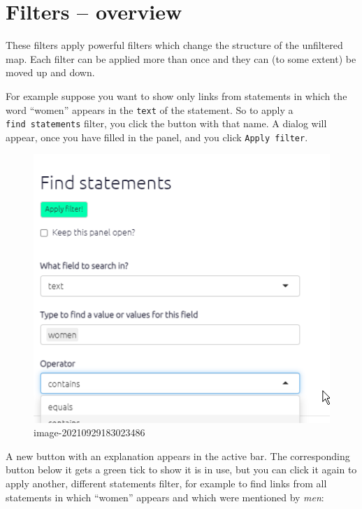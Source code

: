 \documentclass[
]{book}
\begin{document}
\hypertarget{filters-overview}{%
\chapter{Filters -- overview}\label{filters-overview}}

These filters apply powerful filters which change the structure of the unfiltered map. Each filter can be applied more than once and they can (to some extent) be moved up and down.

For example suppose you want to show only links from statements in which the word ``women'' appears in the \texttt{text} of the statement. So to apply a \texttt{find\ statements} filter, you click the button with that name. A dialog will appear, once you have filled in the panel, and you click \texttt{Apply\ filter}.

\begin{figure}
\centering
\includegraphics[width=6.77083in,height=\textheight]{_assets/image-20210929183023486.png}
\caption{image-20210929183023486}
\end{figure}

A new button with an explanation appears in the active bar. The corresponding button below it gets a green tick to show it is in use, but you can click it again to apply another, different statements filter, for example to find links from all statements in which ``women'' appears and which were mentioned by \emph{men}:
\end{document}

